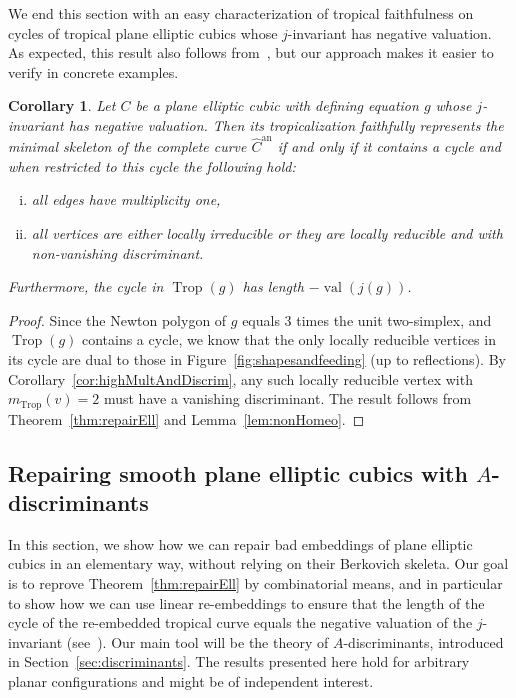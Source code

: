 \documentclass[11pt]{amsart}
\numberwithin{equation}{section}
\theoremstyle{plain}
\newtheorem{corollary}[theorem]{Corollary}
\theoremstyle{definition}
\theoremstyle{remark}
\begin{document}
We end this section with an easy characterization of tropical faithfulness on cycles of tropical plane elliptic cubics whose $j$-invariant has negative valuation. As expected,  this result also follows from~\cite[Section 6]{BPR11}, but our approach makes it easier to verify in concrete examples.
\begin{corollary} Let $C$ be a plane elliptic cubic with defining equation $g$ whose $j$-invariant has negative valuation. Then its tropicalization faithfully represents the minimal skeleton of the complete curve $\widehat{C}^\operatorname{an}$ if and only if it contains a cycle  and when restricted to this cycle the following hold:
  \begin{enumerate}[(i)]
  \item all edges have multiplicity one,
\item all vertices are either locally irreducible or they are locally reducible and with non-vanishing discriminant.
  \end{enumerate}
Furthermore, the cycle in $\operatorname{Trop}(g)$ has length $-\operatorname{val}(j(g))$.
\end{corollary}
\begin{proof}
  Since the Newton polygon of $g$ equals 3 times the unit two-simplex,
  and $\operatorname{Trop}(g)$ contains a cycle, we know that the only locally
  reducible vertices in its cycle are dual to those in
  Figure~\ref{fig:shapesandfeeding} (up to reflections). By
  Corollary~\ref{cor:highMultAndDiscrim}, any such locally reducible
  vertex with $m_\operatorname{Trop}(v)=2$ must have a vanishing
  discriminant. The result follows from Theorem~\ref{thm:repairEll}
  and Lemma~\ref{lem:nonHomeo}.
\end{proof}

\subsection{Repairing smooth plane elliptic cubics with $A$-discriminants}\label{sec:repa-ellipt-cubics}
In this section, we show how we can repair bad embeddings of plane
elliptic cubics in an elementary way, without relying on their
Berkovich skeleta. Our goal is to reprove Theorem~\ref{thm:repairEll}
by combinatorial means, and in particular to show how we can use
linear re-embeddings to ensure that the length of the cycle of the
re-embedded tropical curve equals the negative valuation of the
$j$-invariant (see~\cite{KMM07}). Our main tool will be the theory of
$A$-discriminants, introduced in Section~\ref{sec:discriminants}. The
results presented here hold for arbitrary planar configurations and
might be of independent interest.
\end{document}
